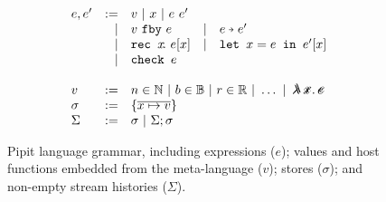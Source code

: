 \begin{figure}
  \[
  \begin{array}{lrlll}
    e, e' & := & v ~|~ x ~|~ e~e' \\
          & | & \xfby{v}{e} & | & \xthen{e}{e'} \\
          & | & \xrec{x}{e[x]} & | & \xlet{x}{e}{e'[x]} \\
          & | & \xcheck{e} \\
    \\
    v & := & \multicolumn{3}{l}{n \in \mathbb{N} ~|~ b \in \mathbb{B} ~|~ r \in \mathbb{R} ~|~ \hdots ~|~ \mlamX}
    \\
    \sigma & := & \sgl{\ov{x \mapsto v}} \\
    \Sigma & := & \sigma ~|~ \Sigma;\sigma \\
    \end{array}
  \]
  \caption{Pipit language grammar, including expressions ($e$); values and host functions embedded from the \fstar{} meta-language ($v$); stores ($\sigma$); and non-empty stream histories ($\Sigma$).}
  \label{f:core-grammar}
\end{figure}